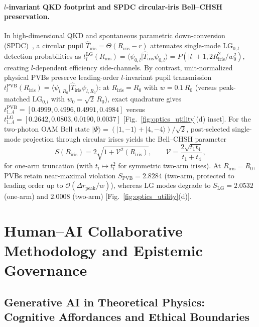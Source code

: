 \documentclass[aps,pra,onecolumn,notitlepage,11pt,tightenlines,amsmath,amssymb,floatfix,longbibliography]{revtex4-2}
\providecommand{\ket}[1]{\lvert#1\rangle}
\providecommand{\braket}[2]{\langle#1\vert#2\rangle}
\providecommand{\abs}[1]{\lvert#1\rvert}
\begin{document}
\paragraph*{$l$-invariant QKD footprint and SPDC circular-iris Bell--CHSH preservation.}
In high-dimensional QKD and spontaneous parametric down-conversion (SPDC)~\cite{Cerf2002,LawEberly2004,Walborn2010,Mirhosseini2015}, a circular pupil $\hat{T}_{\mathrm{iris}} = \Theta(R_{\mathrm{iris}} - r)$ attenuates single-mode $\mathrm{LG}_{0,l}$ detection probabilities as $t_l^{\mathrm{LG}}(R_{\mathrm{iris}}) = \braket{\psi_{0,l}}{\hat{T}_{\mathrm{iris}}\psi_{0,l}} = P(\abs{l}+1, 2R_{\mathrm{iris}}^2/w_0^2)$, creating $l$-dependent efficiency side-channels. By contrast, unit-normalized physical PVBs preserve leading-order $l$-invariant pupil transmission $t_l^{\mathrm{PVB}}(R_{\mathrm{iris}}) = \braket{\psi_{l,R_0}}{\hat{T}_{\mathrm{iris}}\psi_{l,R_0}}$: at $R_{\mathrm{iris}} = R_0$ with $w = 0.1\,R_0$ (versus peak-matched $\mathrm{LG}_{0,l}$ with $w_0 = \sqrt{2}\,R_0$), exact quadrature gives $t_{1..4}^{\mathrm{PVB}} = [0.4999, 0.4996, 0.4991, 0.4984]$ versus $t_{1..4}^{\mathrm{LG}} = [0.2642, 0.0803, 0.0190, 0.0037]$ [Fig.~\ref{fig:optics_utility}(d) inset]. For the two-photon OAM Bell state $\ket{\Psi} = (\ket{1,-1} + \ket{4,-4})/\sqrt{2}$, post-selected single-mode projection through circular irises yields the Bell--CHSH parameter~\cite{Clauser1969}
\begin{equation}
S(R_{\mathrm{iris}}) = 2\sqrt{1 + \mathcal{V}^2(R_{\mathrm{iris}})}, \qquad \mathcal{V} = \frac{2\sqrt{t_1 t_4}}{t_1 + t_4},
\label{eq:iris_chsh}
\end{equation}
for one-arm truncation (with $t_l \mapsto t_l^2$ for symmetric two-arm irises). At $R_{\mathrm{iris}} = R_0$, PVBs retain near-maximal violation $S_{\mathrm{PVB}} = 2.8284$ (two-arm, protected to leading order up to $\mathcal{O}(\Delta r_{\mathrm{peak}}/w)$), whereas $\mathrm{LG}$ modes degrade to $S_{\mathrm{LG}} = 2.0532$ (one-arm) and $2.0008$ (two-arm) [Fig.~\ref{fig:optics_utility}(d)].

\section{Human--AI Collaborative Methodology and Epistemic Governance}
\label{sec:ai_methodology}

\subsection{Generative AI in Theoretical Physics: Cognitive Affordances and Ethical Boundaries}
\label{subsec:ai_ethics}
\end{document}

